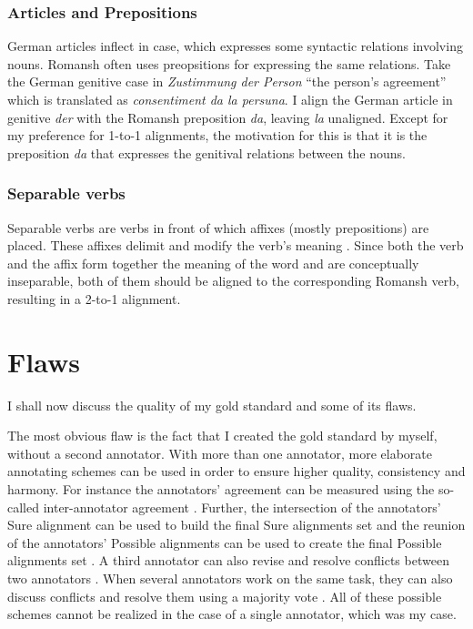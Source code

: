 \subsubsection{Articles and Prepositions}
German articles inflect in case, which expresses some syntactic relations involving nouns. 
Romansh often uses preopsitions for expressing the same relations. 
Take the German genitive case in \emph{Zustimmung der Person} \enquote{the person's agreement} which is translated as \emph{consentiment da la persuna}. 
I align the German article in genitive  \emph{der} with the Romansh preposition \emph{da}, leaving \emph{la} unaligned. 
Except for my preference for 1-to-1 alignments, the motivation for this is that it is the preposition \emph{da} that expresses the genitival relations between the nouns.

\subsubsection{Separable verbs}
Separable verbs are verbs in front of which affixes (mostly prepositions) are placed. 
These affixes delimit and modify the verb's meaning \autocite[47]{dryer-2009}. 
Since both the verb and the affix form together the meaning of the word and are conceptually inseparable, both of them should be aligned to the corresponding Romansh verb, resulting in a 2-to-1 alignment.

\section{Flaws}
\label{sec:gold-flaws}
I shall now discuss the quality of my gold standard and some of its flaws.

The most obvious flaw is the fact that I created the gold standard by myself, without a second annotator. 
With more than one annotator, more elaborate annotating schemes can be used in order to ensure higher quality, consistency and harmony. 
For instance the annotators' agreement can be measured using the so-called inter-annotator agreement \autocite{holmqvist-ahrenberg-2011-gold}. 
Further, the intersection of the annotators' Sure alignment can be used to build the final Sure alignments set and the reunion of the annotators' Possible alignments can be used to create the final Possible alignments set \autocite{mihalcea-pedersen-2003-evaluation}.
A third annotator can also revise and resolve conflicts between two annotators \autocite{mihalcea-pedersen-2003-evaluation}.
When several annotators work on the same task, they can also discuss conflicts and resolve them using a majority vote \autocite{DBLP:journals/corr/cmp-lg-9805004}.
All of these possible schemes cannot be realized in the case of a single annotator, which was my case.

